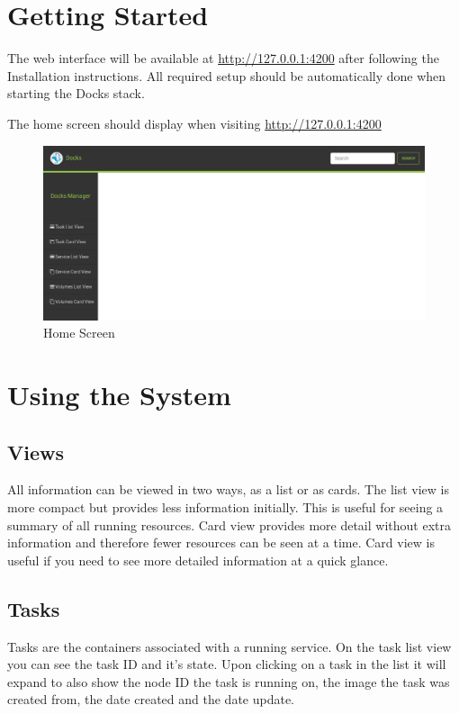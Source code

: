 \documentclass[]{article}
\begin{document}
\section{Getting Started}
The web interface will be available at \url{http://127.0.0.1:4200} after following the Installation instructions.
All required setup should be automatically done when starting the Docks stack.

The home screen should display when visiting \url{http://127.0.0.1:4200}

\begin{figure}[H]
	\centering
	\includegraphics[scale=0.4]{home.png}
	\caption{Home Screen}
\end{figure}

\section{Using the System}

\subsection{Views}
All information can be viewed in two ways, as a list or as cards. The list view is more compact but provides less
information initially. This is useful for seeing a summary of all running resources. Card view provides more detail
without extra information and therefore fewer resources can be seen at a time. Card view is useful if you
need to see more detailed information at a quick glance.

\subsection{Tasks}
Tasks are the containers associated with a running service. On the task list view you can see the task ID and it's state. Upon clicking on a task in the list it will expand to also show the node ID the task is running on, the image the task was created from, the date created and the date update.
\end{document}
